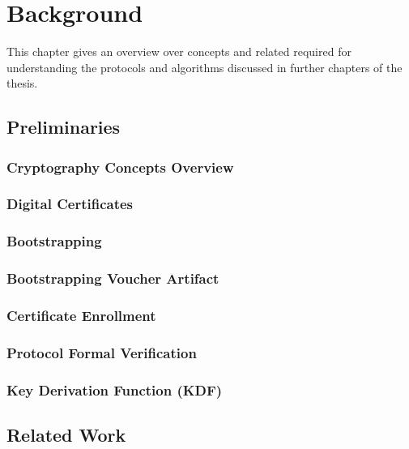 \chapter{Background}
\label{ch:background}
This chapter gives an overview over concepts and related required for understanding the protocols and algorithms discussed in further chapters of the thesis.
\section{Preliminaries}

\subsection{Cryptography Concepts Overview}


\subsection{Digital Certificates}


\subsection{Bootstrapping}


\subsection{Bootstrapping Voucher Artifact}


\subsection{Certificate Enrollment}


\subsection{Protocol Formal Verification}\label{bg:pfm}


\subsection{Key Derivation Function (KDF)} \label{backgroung:kdf}


\section{Related Work}

